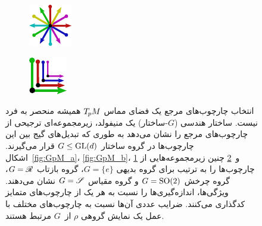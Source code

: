 \begin{figure}[htbp]
\begin{subfigure}[b]{0.24\textwidth}
		\includegraphics[width=0.8\linewidth]{figures/GpM_SO2.pdf}
		\label{fig:GpM_c}
	\end{subfigure}
	\hspace*{.5em}
	\begin{subfigure}[b]{0.24\textwidth}
		\centering
		\includegraphics[width=0.8\linewidth]{figures/GpM_scale.pdf}
		\label{fig:GpM_d}
	\end{subfigure}
	
	\caption{
		انتخاب چارچوب‌های مرجع یک فضای مماس $T_{\mkern-1.5mu p}\mkern-.5muM$ همیشه منحصر به فرد نیست.
		ساختار هندسی ($G$-ساختار) یک منیفولد، زیرمجموعه‌ای ترجیحی از چارچوب‌های مرجع را نشان می‌دهد به طوری که تبدیل‌های گیج بین این چارچوب‌ها در گروه ساختار $G\leq\operatorname{GL}(d)$ قرار می‌گیرند.
		اشکال~\ref{fig:GpM_a}، \ref{fig:GpM_b}، \ref{fig:GpM_c} و~\ref{fig:GpM_d}
		چنین زیرمجموعه‌هایی از چارچوب‌ها را به ترتیب برای گروه بدیهی $G=\{e\}$، گروه بازتاب $G=\mathscr{R}$، گروه چرخش $G=\operatorname{SO}(2)$ و گروه مقیاس $G=\mathscr{S}$ نشان می‌دهند.
		ویژگی‌ها، اندازه‌گیری‌ها را نسبت به هر یک از چارچوب‌های متمایز کدگذاری می‌کنند.
		ضرایب عددی آن‌ها نسبت به چارچوب‌های مختلف با عمل یک نمایش گروهی $\rho$ از~$G$ مرتبط هستند.
	}
	\label{fig:GpM_examples}
\end{figure}


